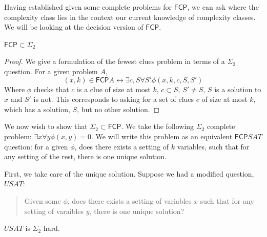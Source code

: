 \documentclass[runningheads,a4paper]{llncs}
\begin{document}
Having established given some complete problems for $\mathsf{FCP}$, we can ask where the complexity class lies in the context our current knowledge of complexity classes. We will be looking at the decision version of $\mathsf{FCP}$. 

\begin{proposition}
\label{prop:fcpsigma2}
$\mathsf{FCP} \subset \Sigma_2$
\end{proposition}

\begin{proof}
We give a formulation of the fewest clues problem in terms of a $\Sigma_2$ question. For a given problem $A$,
\[ (x, k) \in \mathsf{FCP} A \leftrightarrow \exists c, S \forall S' \phi(x, k, c, S, S') \]
Where $\phi$ checks that $c$ is a clue of size at most $k$, $c \subset S$, $S' \neq S$, $S$ is a solution to $x$ and $S'$ is not. This corresponds to asking for a set of clues $c$ of size at most $k$, which has a solution, $S$, but no other solution.  
\end{proof}

We now wish to show that $\Sigma_2 \subset \mathsf{FCP}$. We take the following $\Sigma_2$ complete problem: $\exists x \forall y \phi(x,y) = 0$. We will write this problem as an equivalent $\mathsf{FCP} SAT$ question: for a given $\phi$, does there exists a setting of $k$ variables, such that for any setting of the rest, there is one unique solution.

First, we take care of the unique solution. Suppose we had a modified question, $USAT$:
\begin{quote} 
Given some $\phi$, does there exists a setting of variables $x$ such that for any setting of varaibles $y$, there is one unique solution? 
\end{quote}

\begin{lemma}
$USAT$ is $\Sigma_2$ hard.
\end{lemma}
\end{document}
